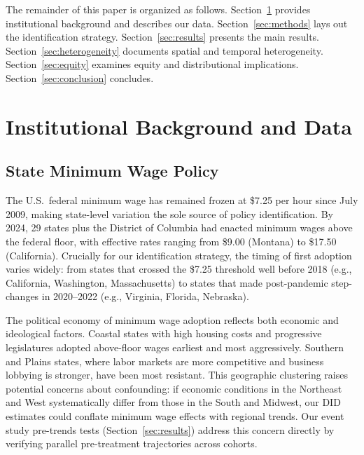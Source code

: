 \documentclass[12pt]{article}
\begin{document}
The remainder of this paper is organized as follows.
Section~\ref{sec:background} provides institutional background and describes
our data.  Section~\ref{sec:methods} lays out the identification strategy.
Section~\ref{sec:results} presents the main results.
Section~\ref{sec:heterogeneity} documents spatial and temporal heterogeneity.
Section~\ref{sec:equity} examines equity and distributional implications.
Section~\ref{sec:conclusion} concludes.

\section{Institutional Background and Data}
\label{sec:background}

\subsection{State Minimum Wage Policy}

The U.S.\ federal minimum wage has remained frozen at \$7.25 per hour since
July 2009, making state-level variation the sole source of policy identification.
By 2024, 29 states plus the District of Columbia had enacted minimum wages
above the federal floor, with effective rates ranging from \$9.00 (Montana)
to \$17.50 (California).  Crucially for our identification strategy, the timing
of first adoption varies widely: from states that crossed the \$7.25 threshold
well before 2018 (e.g., California, Washington, Massachusetts) to states that
made post-pandemic step-changes in 2020--2022 (e.g., Virginia, Florida,
Nebraska).

The political economy of minimum wage adoption reflects both economic and
ideological factors.  Coastal states with high housing costs and progressive
legislatures adopted above-floor wages earliest and most aggressively.  Southern
and Plains states, where labor markets are more competitive and business
lobbying is stronger, have been most resistant.  This geographic clustering
raises potential concerns about confounding: if economic conditions in the
Northeast and West systematically differ from those in the South and Midwest,
our DID estimates could conflate minimum wage effects with regional trends.
Our event study pre-trends tests (Section~\ref{sec:results}) address this
concern directly by verifying parallel pre-treatment trajectories across cohorts.
\end{document}
